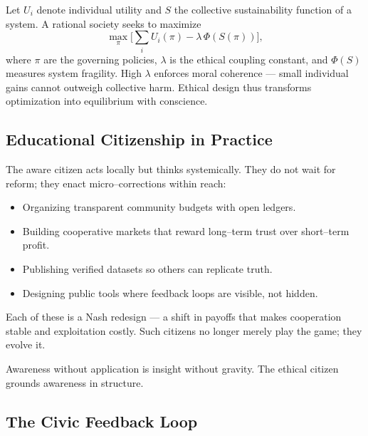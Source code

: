 \documentclass[12pt,twoside]{book}
\begin{document}
\begin{tcolorbox}[colback=gray!5,
  colframe=gray!60,
  boxrule=0.4pt,
  arc=1mm,
  title={Mathematical Interlude: Ethical Optimization Principle},
  enhanced,
  breakable,
  left=5pt,
  right=5pt]
\small
Let $U_i$ denote individual utility and $S$ the collective sustainability function of a system.  
A rational society seeks to maximize
\[
\max_{\pi} \Bigg[ \sum_i U_i(\pi) - \lambda\,\Phi(S(\pi)) \Bigg],
\]
where $\pi$ are the governing policies, $\lambda$ is the ethical coupling constant, and $\Phi(S)$ measures system fragility.  
High $\lambda$ enforces moral coherence — small individual gains cannot outweigh collective harm.  
Ethical design thus transforms optimization into equilibrium with conscience.
\end{tcolorbox}

\subsection*{Educational Citizenship in Practice}

The aware citizen acts locally but thinks systemically.  
They do not wait for reform; they enact micro–corrections within reach:
\begin{itemize}
  \item Organizing transparent community budgets with open ledgers.  
  \item Building cooperative markets that reward long–term trust over short–term profit.  
  \item Publishing verified datasets so others can replicate truth.  
  \item Designing public tools where feedback loops are visible, not hidden.
\end{itemize}

Each of these is a Nash redesign — a shift in payoffs that makes cooperation stable and exploitation costly.  
Such citizens no longer merely play the game; they evolve it.\\

\begin{keyidea}
Awareness without application is insight without gravity.  
The ethical citizen grounds awareness in structure.
\end{keyidea}

\subsection*{The Civic Feedback Loop}
\end{document}
